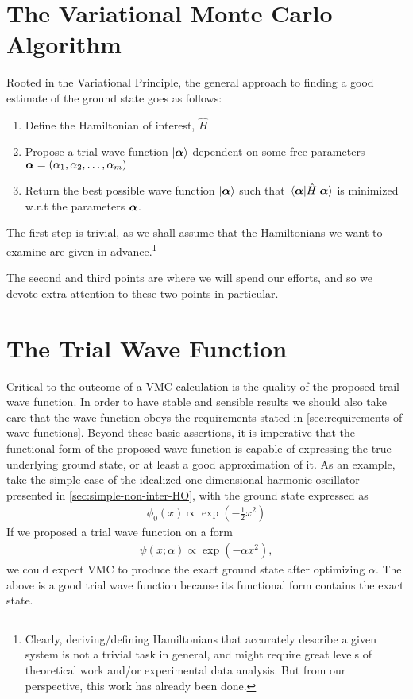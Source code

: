 \documentclass[Thesis.tex]{subfiles}
\begin{document}
\section{The Variational Monte Carlo Algorithm}

Rooted in the Variational Principle, the general approach to finding a good estimate of
the ground state goes as follows:

\begin{enumerate}
    \item Define the Hamiltonian of interest, $\hat H$
    \item Propose a trial wave function $| \bm{\alpha} \rangle$ dependent on some free parameters
        $\bm{\alpha}=\qty(\alpha_1, \alpha_2,\dots, \alpha_m)$
    \item Return the best possible wave function $| \bm{\alpha} \rangle$ such that $\expval{\hat
        H}{\bm{\alpha}}$ is minimized w.r.t the parameters $\bm{\alpha}$.
\end{enumerate}
The first step is trivial, as we shall assume that the Hamiltonians we want to examine are
given in advance.\footnote{Clearly, deriving/defining Hamiltonians that accurately describe a given
system is not a trivial task in general, and might require great levels of theoretical
work and/or experimental data analysis. But from our perspective, this work has already
been done.}

The second and third points are where we will spend our efforts, and so we devote extra
attention to these two points in particular.


\section{The Trial Wave Function}

Critical to the outcome of a VMC calculation is the quality of the proposed trail wave
function. In order to have stable and sensible results we should also take care that the
wave function obeys the requirements stated in
\autoref{sec:requirements-of-wave-functions}. Beyond these basic assertions, it is
imperative that the functional form of the proposed wave function is capable of expressing
the true underlying ground state, or at least a good approximation of it. As an example,
take the simple case of the idealized one-dimensional harmonic oscillator presented in
\autoref{sec:simple-non-inter-HO}, with the ground state expressed as
\begin{align}
    \phi_0(x) \propto \exp(- \frac{1}{2} x^2)
\end{align}
If we proposed a trial wave function on a form 
\begin{align}
    \psi(x; \alpha)\propto \exp(- \alpha x^2),
\end{align}
we could expect VMC to produce the exact ground state after optimizing $\alpha$. The above
is a good trial wave function because its functional form contains the exact state.
\end{document}
